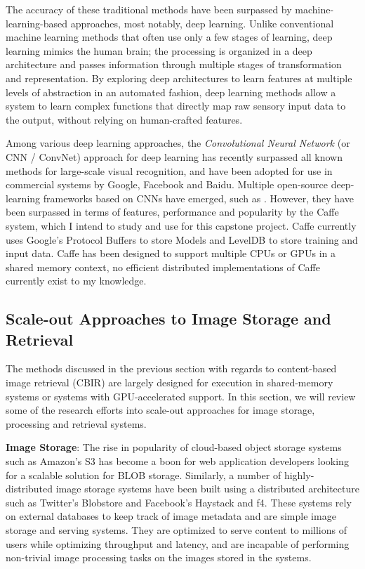 \documentclass[letterpaper,twocolumn,10pt]{article}
\begin{document}
The accuracy of these traditional methods have been surpassed by machine-learning-based approaches, most notably, deep learning\cite{Wan:2014}. Unlike conventional machine learning methods that often use only a few stages of learning, deep learning mimics the human brain; the processing is organized in a deep architecture and passes information through multiple stages of transformation and representation. By exploring deep architectures to learn features at multiple levels of abstraction in an automated fashion, deep learning methods allow a system to learn complex functions that directly map raw sensory input data to the output, without relying on human-crafted features.

Among various deep learning approaches, the {\em Convolutional Neural Network} (or CNN / ConvNet) approach for deep learning has recently surpassed all known methods for large-scale visual recognition, and have been adopted for use in commercial systems by Google, Facebook and Baidu.  Multiple open-source deep-learning frameworks based on CNNs have emerged, such as \cite{cudaconvnet, icml2014c1_donahue14, DBLP:journals/corr/SermanetEZMFL13}. However, they have been surpassed in terms of features, performance and popularity by the Caffe system\cite{Jia:2014}, which I intend to study and use for this capstone project. Caffe currently uses Google's Protocol Buffers\cite{protobuf} to store Models and LevelDB\cite{levelDB} to store training and input data. Caffe has been designed to support multiple CPUs or GPUs in a shared memory context, no efficient distributed implementations of Caffe currently exist to my knowledge.  

\subsection{Scale-out Approaches to Image Storage and Retrieval} \label{bigdata}

The methods discussed in the previous section with regards to content-based image retrieval (CBIR) are largely designed for execution in shared-memory systems or systems with GPU-accelerated support. In this section, we will review some of the research efforts into scale-out approaches for image storage, processing and retrieval systems.

\textbf{Image Storage}: The rise in popularity of cloud-based object storage systems such as Amazon's S3\cite{S3} has become a boon for web application developers looking for a scalable solution for BLOB storage. Similarly, a number of highly-distributed image storage systems have been built using a distributed architecture such as Twitter's Blobstore\cite{blobstore} and Facebook's Haystack\cite{beaver2010finding} and f4\cite{f4}. These systems rely on external databases to keep track of image metadata and are simple image storage and serving systems. They are optimized to serve content to millions of users while optimizing throughput and latency, and are incapable of performing non-trivial image processing tasks on the images stored in the systems. 
\end{document}
